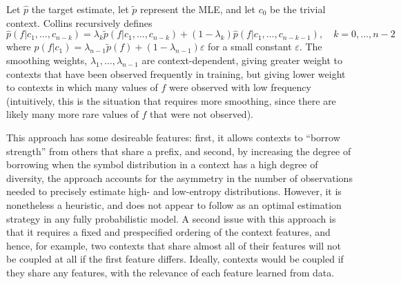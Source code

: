 \documentclass[12pt,letterpaper]{report}
\begin{document}
Let $\hat{p}$ the target estimate, let $\tilde{p}$ represent the MLE, 
and let $c_0$ be the trivial context.  Collins recursively defines
\begin{equation}
  \label{eq:3} \hat{p}(f \vert c_1, \dots, c_{n-k}) = \lambda_k
\tilde{p}(f \vert c_1, \dots, c_{n-k}) + (1 - \lambda_k) \hat{p}(f
\vert c_1, \dots, c_{n-k-1}), \quad k = 0, \dots, n-2
\end{equation} where $\hat{p}(f \vert c_1) = \lambda_{n-1}
\tilde{p}(f) + (1 - \lambda_{n-1}) \varepsilon$ for a small constant
$\varepsilon$.  The smoothing weights, $\lambda_1, \dots,
\lambda_{n-1}$ are context-dependent, giving greater weight to
contexts that have been observed frequently in training, but giving
lower weight to contexts in which many values of $f$ were observed
with low frequency (intuitively, this is the situation that requires
more smoothing, since there are likely many more rare values of $f$
that were not observed).

This approach has some desireable features: first, it allows
contexts to ``borrow strength'' from others that share a prefix, and
second, by increasing the degree of borrowing when the symbol
distribution in a context has a high degree of diversity, the
approach accounts for the asymmetry in the number of observations
needed to precisely estimate high- and low-entropy distributions.
However, it is nonetheless a heuristic, and does not appear to follow
as an optimal estimation strategy in any fully probabilistic model.  A
second issue with this approach is that it requires a fixed and
prespecified ordering of the context features, and hence, for example, two contexts
that share almost all of their features will not be coupled at all if the
first feature differs.  Ideally, contexts would be coupled if they
share any features, with the relevance of each feature learned from data.
\end{document}
